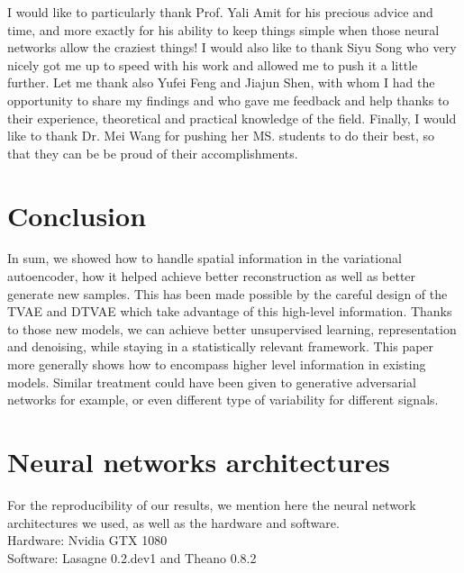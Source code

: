 \documentclass[letterpaper, twoside]{article}
\begin{document}
  I would like to particularly thank Prof. Yali Amit for his precious advice and time, and more exactly for his ability to keep things simple when those neural networks allow the craziest things! I would also like to thank Siyu Song who very nicely got me up to speed with his work and allowed me to push it a little further. Let me thank also Yufei Feng and Jiajun Shen, with whom I had the opportunity to share my findings and who gave me feedback and help thanks to their experience, theoretical and practical knowledge of the field. Finally, I would like to thank Dr. Mei Wang for pushing her MS. students to do their best, so that they can be be proud of their accomplishments.

\section*{Conclusion}

  In sum, we showed how to handle spatial information in the variational autoencoder, how it helped achieve better reconstruction as well as better generate new samples. This has been made possible by the careful design of the TVAE and DTVAE which take advantage of this high-level information. Thanks to those new models, we can achieve better unsupervised learning, representation and denoising, while staying in a statistically relevant framework. This paper more generally shows how to encompass higher level information in existing models. Similar treatment could have been given to generative adversarial networks \cite{Goodfellow.gan} for example, or even different type of variability for different signals. 




\newpage
\appendix
\section{Neural networks architectures}

For the reproducibility of our results, we mention here the neural network architectures we used, as well as the hardware and software. \\
Hardware: Nvidia GTX 1080\\
Software: Lasagne 0.2.dev1 and Theano 0.8.2\\
\end{document}
